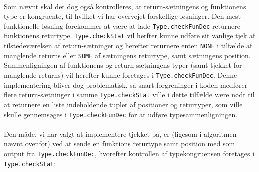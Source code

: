 \documentclass[10pt,a4paper,danish]{article}
\begin{document}
\paragraph{}
Som nævnt skal det dog også kontrolleres, at return-sætningens og funktionens
type er kongruente, til hvilket vi har overvejet forskellige løsninger. Den
mest funktionelle løsning forekommer at være at lade 
\texttt{Type.checkFunDec} returnere
funktionens returtype. \texttt{Type.checkStat}
 vil herfter kunne udføre sit vanlige
tjek af tilstedeværelsen af return-sætninger og herefter returnere enten 
\texttt{NONE}
i tilfælde af manglende returns eller \texttt{SOME}
 af sætningens returtype, samt
sætningens position. 
Sammenligningen af funktionens og return-sætningens typer (samt tjekket
for manglende returns) vil herefter kunne foretages i
\texttt{Type.checkFunDec}.
Denne implementering bliver dog problematisk, så 
snart forgreninger i koden medfører flere return-sætninger i samme
\texttt{Type.checkStat}
ville i dette tilfælde være nødt til at returnere en liste indeholdende
tupler af positioner og returtyper, som ville skulle gennemsøges i 
\texttt{Type.checkFunDec} for at udføre typesammenligningen. 

\paragraph{}
Den måde, vi har valgt at implementere tjekket på, er (ligesom i algoritmen 
nævnt ovenfor) ved at sende en funktions returtype samt position med som 
output fra \texttt{Type.checkFunDec}, hvorefter kontrollen af typekongruensen
foretages i \texttt{Type.checkStat}: 
\end{document}
